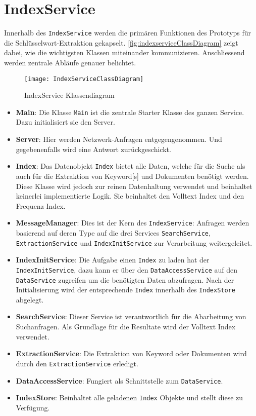 
\newpage

\section{IndexService}\label{indexservice}

Innerhalb des \texttt{IndexService} werden die primären Funktionen des Prototyps für die Schlüsselwort-Extraktion gekapselt. \autoref{fig:indexserviceClassDiagram} zeigt dabei, wie die wichtigsten Klassen miteinander kommunizieren. Anschliessend werden zentrale Abläufe genauer belichtet. 

    \begin{figure}[H]
    \centering
    \texttt{[image: IndexServiceClassDiagram]}
    \caption{IndexService Klassendiagram}
    \label{fig:indexserviceClassDiagram}
    \end{figure}

\begin{itemize}
    \item \textbf{Main}: Die Klasse \texttt{Main} ist die zentrale Starter Klasse des ganzen Service. Dazu initialisiert sie den Server. 
    \item \textbf{Server}: Hier werden Netzwerk-Anfragen entgegengenommen. Und gegebenenfalls wird eine Antwort zu\-rück\-ge\-schi\-ckt.
    \item \textbf{Index}: Das Datenobjekt \texttt{Index} bietet alle Daten, welche für die Suche als auch für die Extraktion von \gls{Keyword}[s] und Dokumenten benötigt werden. Diese Klasse wird jedoch zur reinen Datenhaltung verwendet und beinhaltet keinerlei implementierte Logik. Sie beinhaltet den Volltext Index und den Frequenz Index. 
    \item \textbf{MessageManager}: Dies ist der Kern des \texttt{IndexService}: Anfragen werden basierend auf deren Type auf die drei Services \texttt{Search\-Ser\-vi\-ce}, \texttt{ExtractionService} und \texttt{IndexInitService} zur Verarbeitung weitergeleitet.
    \item \textbf{IndexInitService}: Die Aufgabe einen \texttt{Index} zu laden hat der \texttt{IndexInitService}, dazu kann er über den \texttt{DataAccessService} auf den \texttt{DataService} zugreifen um die benötigten Daten abzufragen. Nach der Initialisierung wird der entsprechende \texttt{Index} innerhalb des \texttt{IndexStore} abgelegt.
    \item \textbf{SearchService}: Dieser Service ist verantwortlich für die Abarbeitung von Suchanfragen. Als Grundlage für die Resultate wird der Volltext Index verwendet.  
    \item \textbf{ExtractionService}: Die Extraktion von \gls{Keyword} oder Dokumenten wird durch den \texttt{ExtractionService} erledigt. 
    \item \textbf{DataAccessService}: Fungiert als Schnittstelle zum \texttt{DataService}.
    \item \textbf{IndexStore}: Beinhaltet alle geladenen \texttt{Index} Objekte und stellt diese zu Verfügung. 
\end{itemize}

